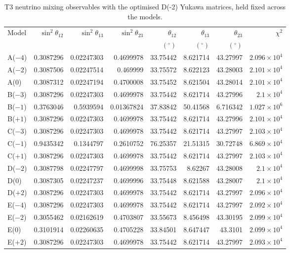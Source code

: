 \begin{table}[p]
\centering
\caption{T3 neutrino mixing observables with the optimised D(-2) Yukawa matrices, held fixed across the models.}
\label{tab:appC_Dm2_mixing}
\begingroup
\footnotesize
\setlength{\tabcolsep}{3.2pt}
\begin{tabular}{lrrrrrrr}
\hline
Model & $\sin^2\theta_{12}$ & $\sin^2\theta_{13}$ & $\sin^2\theta_{23}$ & $\theta_{12}$ & $\theta_{13}$ & $\theta_{23}$ & $\chi^2$ \\
 &  &  &  & $(^\circ)$ & $(^\circ)$ & $(^\circ)$ &  \\
\hline
A($-4$) & 0.3087296 & 0.02247303 & 0.4699978 & 33.75442 & 8.621714 & 43.27997 & $2.096\times10^{4}$ \\
A($-2$) & 0.3087506 & 0.02247514 & 0.469999 & 33.75572 & 8.622123 & 43.28003 & $2.101\times10^{4}$ \\
A($0$) & 0.3087312 & 0.02247194 & 0.4700008 & 33.75452 & 8.621504 & 43.28014 & $2.101\times10^{4}$ \\
B($-3$) & 0.3087296 & 0.02247303 & 0.4699978 & 33.75442 & 8.621714 & 43.27996 & $2.1\times10^{4}$ \\
B($-1$) & 0.3763046 & 0.5939594 & 0.01367824 & 37.83842 & 50.41568 & 6.716342 & $1.027\times10^{6}$ \\
B($+1$) & 0.3087296 & 0.02247303 & 0.4699978 & 33.75442 & 8.621714 & 43.27996 & $2.101\times10^{4}$ \\
C($-3$) & 0.3087296 & 0.02247303 & 0.4699978 & 33.75442 & 8.621714 & 43.27997 & $2.103\times10^{4}$ \\
C($-1$) & 0.9435342 & 0.1344797 & 0.2610752 & 76.25357 & 21.51315 & 30.72748 & $6.869\times10^{4}$ \\
C($+1$) & 0.3087296 & 0.02247303 & 0.4699978 & 33.75442 & 8.621714 & 43.27997 & $2.103\times10^{4}$ \\
D($-2$) & 0.3087798 & 0.02247797 & 0.4699998 & 33.75753 & 8.62267 & 43.28008 & $2.1\times10^{4}$ \\
D($0$) & 0.3087305 & 0.02247237 & 0.4699996 & 33.75448 & 8.621588 & 43.28007 & $2.1\times10^{4}$ \\
D($+2$) & 0.3087296 & 0.02247303 & 0.4699978 & 33.75442 & 8.621714 & 43.27997 & $2.096\times10^{4}$ \\
E($-4$) & 0.3087296 & 0.02247303 & 0.4699978 & 33.75442 & 8.621714 & 43.27997 & $2.092\times10^{4}$ \\
E($-2$) & 0.3055462 & 0.02162619 & 0.4703807 & 33.55673 & 8.456498 & 43.30195 & $2.099\times10^{4}$ \\
E($0$) & 0.3101914 & 0.02260635 & 0.4705228 & 33.84501 & 8.647447 & 43.3101 & $2.099\times10^{4}$ \\
E($+2$) & 0.3087296 & 0.02247303 & 0.4699978 & 33.75442 & 8.621714 & 43.27997 & $2.093\times10^{4}$ \\
\hline
\end{tabular}
\endgroup
\end{table}
